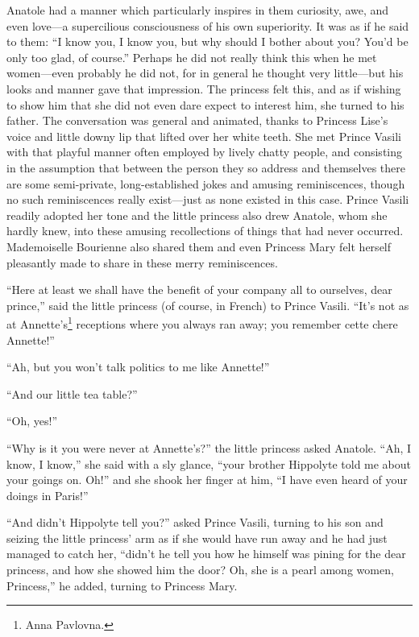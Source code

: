 Anatole had a manner which particularly inspires in them
curiosity, awe, and even love---a supercilious consciousness of
his own superiority. It was as if he said to them: ``I know you,
I know you, but why should I bother about you?  You'd be only too
glad, of course.'' Perhaps he did not really think this when he
met women---even probably he did not, for in general he thought
very little---but his looks and manner gave that impression. The
princess felt this, and as if wishing to show him that she did
not even dare expect to interest him, she turned to his
father. The conversation was general and animated, thanks to
Princess Lise's voice and little downy lip that lifted over her
white teeth. She met Prince Vasili with that playful manner often
employed by lively chatty people, and consisting in the
assumption that between the person they so address and themselves
there are some semi-private, long-established jokes and amusing
reminiscences, though no such reminiscences really exist---just
as none existed in this case. Prince Vasili readily adopted her
tone and the little princess also drew Anatole, whom she hardly
knew, into these amusing recollections of things that had never
occurred. Mademoiselle Bourienne also shared them and even
Princess Mary felt herself pleasantly made to share in these
merry reminiscences.

``Here at least we shall have the benefit of your company all to
ourselves, dear prince,'' said the little princess (of course, in
French) to Prince Vasili. ``It's not as at
Annette's\footnote{Anna Pavlovna.} receptions where you always
ran away; you remember cette chere Annette!''

``Ah, but you won't talk politics to me like Annette!''

``And our little tea table?''

``Oh, yes!''

``Why is it you were never at Annette's?'' the little princess
asked Anatole. ``Ah, I know, I know,'' she said with a sly
glance, ``your brother Hippolyte told me about your goings
on. Oh!'' and she shook her finger at him, ``I have even heard of
your doings in Paris!''

``And didn't Hippolyte tell you?'' asked Prince Vasili, turning
to his son and seizing the little princess' arm as if she would
have run away and he had just managed to catch her, ``didn't he
tell you how he himself was pining for the dear princess, and how
she showed him the door? Oh, she is a pearl among women,
Princess,'' he added, turning to Princess Mary.

